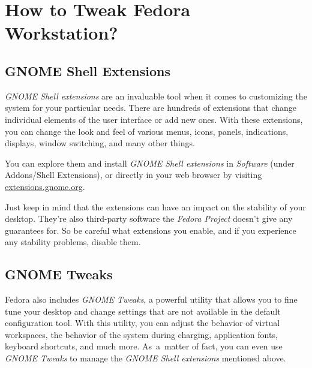 \chapter*{How to Tweak Fedora Workstation?}
\section*{GNOME Shell Extensions}

\emph{GNOME Shell extensions} are an invaluable tool when it comes to customizing the system for your particular needs. There are hundreds of extensions that change individual elements of the user interface or add new ones. With these extensions, you can change the look and feel of various menus, icons, panels, indications, displays, window switching, and many other things.

You can explore them and install \emph{GNOME Shell extensions} in \emph{Software} (under Addons/Shell Extensions), or directly in your web browser by visiting \url{extensions.gnome.org}.

Just keep in mind that the extensions can have an impact on the stability of your desktop. They're also third-party software the \emph{Fedora Project} doesn't give any guarantees for. So be careful what extensions you enable, and if you experience any stability problems, disable them.

\section*{GNOME Tweaks}

Fedora also includes \emph{GNOME Tweaks}, a powerful utility that allows you to fine tune your desktop and change settings that are not available in the default configuration tool. With this utility, you can adjust the behavior of virtual workspaces, the behavior of the system during charging, application fonts, keyboard shortcuts, and much more. As~a~matter of fact, you can even use \emph{GNOME Tweaks} to manage the \emph{GNOME Shell extensions} mentioned above.
\endinput
